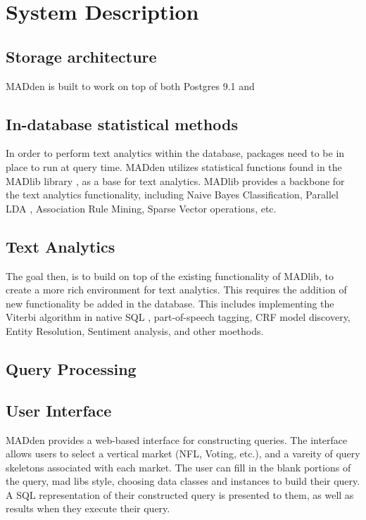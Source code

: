 
\section{System Description}

\subsection{Storage architecture}
MADden is built to work on top of 
both Postgres 9.1 and 

\subsection{In-database statistical methods}
In order to perform text analytics within the database,
packages need to be in place to run at query time.
MADden utilizes statistical functions found in the 
MADlib library \cite{Cohen:2009:MSN:1687553.1687576}, as
a base for text analytics. MADlib provides a 
backbone for the text analytics functionality, including
Naive Bayes Classification, Parallel LDA \cite{Blei:2003:LDA:944919.944937} ,
Association Rule Mining, Sparse Vector operations, etc. 
\subsection{Text Analytics}
The goal then, is to build on top of the existing functionality of MADlib,
to create a more rich environment for text analytics. This requires the 
addition of new functionality be added in the database. This includes
implementing the Viterbi algorithm in native SQL \cite{wang2011hybrid},
part-of-speech tagging, CRF model discovery, Entity Resolution, 
Sentiment analysis, and other moethods.



\subsection{Query Processing}

\subsection{User Interface}
MADden provides a web-based interface for
constructing queries. The interface allows
users to select a vertical market (NFL, Voting, etc.),
and a vareity of query skeletons associated with
each market. The user can fill in the
blank portions of the query, mad libs style, choosing
data classes and instances to build their query. A SQL
representation of their constructed query is presented to them,
as well as results when they execute their query. 
 

